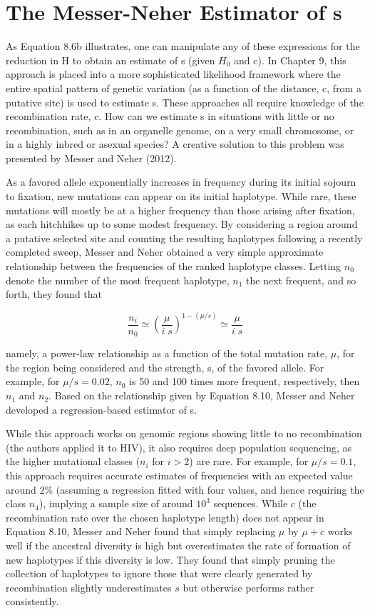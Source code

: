 \documentclass{article}
\begin{document}
\section{The Messer-Neher Estimator of s}
As Equation 8.6b illustrates, one can manipulate any of these expressions for the reduction in H to obtain an estimate of s (given  $ H_{0} $ and c). In Chapter 9, this approach is placed into a more sophisticated likelihood framework where the entire spatial pattern of genetic variation (as a function of the distance, c, from a putative site) is used to estimate s. These approaches all require knowledge of the recombination rate, c. How can we estimate s in situations with little or no recombination, such as in an organelle genome, on a very small chromosome, or in a highly inbred or asexual species? A creative solution to this problem was presented by Messer and Neher (2012).

As a favored allele exponentially increases in frequency during its initial sojourn to fixation, new mutations can appear on its initial haplotype. While rare, these mutations will mostly be at a higher frequency than those arising after fixation, as each hitchhikes up to some modest frequency. By considering a region around a putative selected site and counting the resulting haplotypes following a recently completed sweep, Messer and Neher obtained a very simple approximate relationship between the frequencies of the ranked haplotype classes. Letting  $ n_{0} $ denote the number of the most frequent haplotype,  $ n_{1} $ the next frequent, and so forth, they found that

\begin{equation}
\frac{n_{i}}{n_{0}}\simeq\left(\frac{\mu}{i\;s}\right)^{1-(\mu/s)}\simeq\frac{\mu}{i\;s}
\tag{8.10}
\label{eq:8_10}
\end{equation}

namely, a power-law relationship as a function of the total mutation rate,  $ \mu $, for the region being considered and the strength, s, of the favored allele. For example, for  $ \mu/s = 0.02 $,  $ n_{0} $ is 50 and 100 times more frequent, respectively, then  $ n_{1} $ and  $ n_{2} $. Based on the relationship given by Equation 8.10, Messer and Neher developed a regression-based estimator of s.

While this approach works on genomic regions showing little to no recombination (the authors applied it to HIV), it also requires deep population sequencing, as the higher mutational classes ($n_i$ for $i > 2$) are rare. For example, for $\mu/s = 0.1$, this approach requires accurate estimates of frequencies with an expected value around $2\%$ (assuming a regression fitted with four values, and hence requiring the class $n_4$), implying a sample size of around $10^3$ sequences. While $c$ (the recombination rate over the chosen haplotype length) does not appear in Equation 8.10, Messer and Neher found that simply replacing $\mu$ by $\mu+c$ works well if the ancestral diversity is high but overestimates the rate of formation of new haplotypes if this diversity is low. They found that simply pruning the collection of haplotypes to ignore those that were clearly generated by recombination slightly underestimates $s$ but otherwise performs rather consistently.
\end{document}

